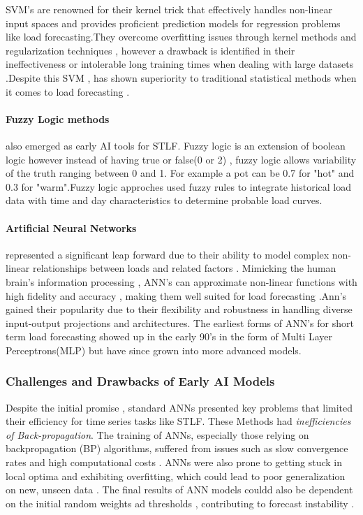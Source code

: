  SVM's are renowned for their kernel trick that effectively handles non-linear input spaces and provides proficient prediction models for regression problems like load forecasting\cite{hussien2021comparative}.They overcome overfitting issues through kernel methods and regularization techniques \cite{hussien2021comparative} , however a drawback is identified in their ineffectiveness or intolerable long training times when dealing with large datasets \cite{dong2017short}.Despite this SVM , has shown superiority to traditional statistical methods when it comes to load forecasting \cite{gochhait2023regression}.
 
 \paragraph{Fuzzy Logic methods} also emerged as early AI tools for STLF. Fuzzy logic is an extension of boolean logic however instead of having true or false(0 or 2)  , fuzzy logic allows variability of the truth ranging between 0 and 1. For example a pot can be 0.7 for "hot" and 0.3 for "warm".Fuzzy logic approches used fuzzy rules to integrate historical load data with time and day characteristics to determine probable load curves\cite{rafi2021short}.
 
 
 \paragraph{Artificial Neural Networks} represented a significant leap forward due to their ability to model complex non-linear  relationships between loads and related factors \cite{dong2017short}. Mimicking the human brain's information processing  , ANN's can approximate non-linear functions with high fidelity and accuracy , making them well suited for  load forecasting \cite{arvanitidis2021enhanced}.Ann's gained their popularity due to their flexibility and robustness in handling diverse input-output projections and architectures. The earliest forms of ANN's for short term load forecasting showed up in the early 90's in the form of Multi Layer Perceptrons(MLP) \cite{arvanitidis2021enhanced} but have since grown into more advanced models.
 
 
 \subsubsection{Challenges and Drawbacks of Early AI Models}
 Despite the initial promise , standard ANNs presented key problems that limited their efficiency for time series tasks like STLF.
 These Methods had \textit{inefficiencies of Back-propagation}. The training of ANNs, especially those relying on backpropagation (BP) algorithms, suffered from issues such as slow convergence rates and high computational costs \cite{dong2017short}. ANNs were also prone to getting stuck in local optima and exhibiting overfitting, which could lead to poor generalization on new, unseen data \cite{wang2023short}. The final results of ANN models couldd also be dependent on the initial random weights ad thresholds , contributing to forecast instability \cite{arvanitidis2021enhanced}.
 
